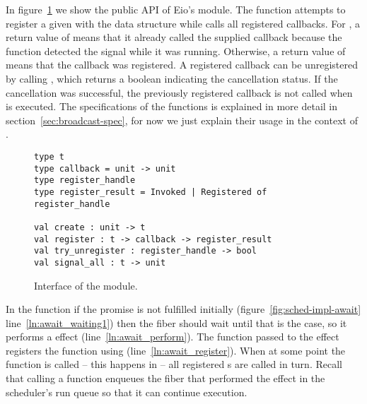 In figure~\ref{fig:sched-impl-broadcast} we show the public API of Eio's  module.
The  function attempts to register a given  with the data structure while  calls all registered callbacks.
For , a return value of  means that it already called the supplied callback because the function detected the signal while it was running.
Otherwise, a return value of  means that the callback was registered.
A registered callback can be unregistered by calling , which returns a boolean indicating the cancellation status.
If the cancellation was successful, the previously registered callback is not called when  is executed.
The specifications of the functions is explained in more detail in section~\ref{sec:broadcast-spec}, for now we just explain their usage in the context of .

\begin{figure}[ht]
  \begin{verbatim}
type t
type callback = unit -> unit
type register_handle
type register_result = Invoked | Registered of register_handle

val create : unit -> t
val register : t -> callback -> register_result
val try_unregister : register_handle -> bool
val signal_all : t -> unit
  \end{verbatim}
  \caption{Interface of the  module.}
  \label{fig:sched-impl-broadcast}
\end{figure}

In the  function if the promise is not fulfilled initially (figure~\ref{fig:sched-impl-await} line~\ref{ln:await_waiting1})
then the fiber should wait until that is the case, so it performs a \esuspend{} effect (line~\ref{ln:await_perform}).
The  function passed to the effect registers the  function using  (line~\ref{ln:await_register}).
When at some point the  function is called -- this happens in  -- all registered s are called in turn.
Recall that calling a  function enqueues the fiber that performed the \esuspend{} effect in the scheduler's run queue so that it can continue execution.


